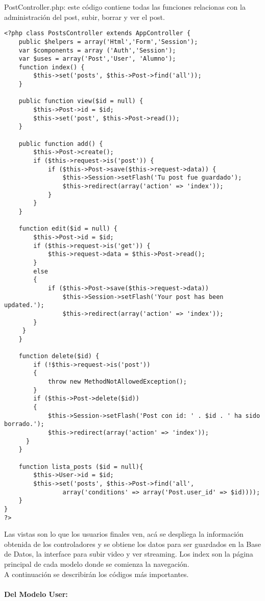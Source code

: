 \documentclass[12pt]{article}
\begin{document}
PostController.php: este código contiene todas las funciones relacionas con la administración del post, 
subir, borrar y ver el post.\\
\footnotesize
\begin{verbatim}
<?php class PostsController extends AppController {
	public $helpers = array('Html','Form','Session'); 
	var $components = array ('Auth','Session'); 
	var $uses = array('Post','User', 'Alumno');
	function index() {
		$this->set('posts', $this->Post->find('all'));
	}

	public function view($id = null) {
		$this->Post->id = $id;
	    $this->set('post', $this->Post->read());
	}

	public function add() {
		$this->Post->create();
		if ($this->request->is('post')) {
			if ($this->Post->save($this->request->data)) {
				$this->Session->setFlash('Tu post fue guardado');
				$this->redirect(array('action' => 'index'));
			}
		}
	}

	function edit($id = null) {
		$this->Post->id = $id;
	    if ($this->request->is('get')) {
			$this->request->data = $this->Post->read();
		} 
		else 
		{
			if ($this->Post->save($this->request->data)) 
				$this->Session->setFlash('Your post has been updated.');
				$this->redirect(array('action' => 'index'));
		}
	 }
	}

	function delete($id) {
	    if (!$this->request->is('post')) 
		{
			throw new MethodNotAllowedException();
		}
		if ($this->Post->delete($id)) 
		{
			$this->Session->setFlash('Post con id: ' . $id . ' ha sido borrado.');
			$this->redirect(array('action' => 'index'));
	  }
	}

	function lista_posts ($id = null){
		$this->User->id = $id;
		$this->set('posts', $this->Post->find('all', 
				array('conditions' => array('Post.user_id' => $id))));
	}
}
?>
\end{verbatim}

\normalsize
Las vistas son lo que los usuarios finales ven, acá se despliega la información obtenida de los controladores 
y se obtiene los datos para ser guardados en la Base de Datos, la interface para subir video y ver streaming. 
Los index son la página principal de cada modelo donde se comienza la navegación.\\

A continuación se describirán los códigos más importantes.\\

\paragraph{Del Modelo User:\\}
\end{document}
